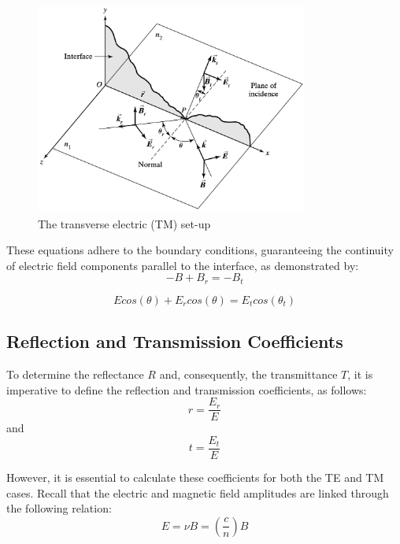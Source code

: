 \begin{figure}
  \centering
  \includegraphics[width=0.8\textwidth]{Chapters/Figures/Incident, Relfected, and Transmitted Ray for TM Mode.jpg}
  \caption{The transverse electric (TM) set-up}
\end{figure}

These equations adhere to the boundary conditions, guaranteeing the continuity of electric field components parallel to the interface, as demonstrated by:
\begin{equation} \label{Magnetic field boundary conditions for TM waves}
-B + B_r = -B_t
\end{equation}

\begin{equation} \label{Electric field boundary conditions for TM waves}
Ecos(\theta) + E_rcos(\theta) = E_tcos(\theta_t)
\end{equation}

\subsection{Reflection and Transmission Coefficients}
To determine the reflectance $R$ and, consequently, the transmittance $T$, it is imperative to define the reflection and transmission coefficients, as follows:
\begin{equation} \label{Definition of the reflection coefficient}
r = \frac{E_r}{E}
\end{equation}
and
\begin{equation} \label{Definition of the transmission coefficient}
t = \frac{E_t}{E}
\end{equation}

However, it is essential to calculate these coefficients for both the TE and TM cases. Recall that the electric and magnetic field amplitudes are linked through the following relation:
\begin{equation} \label{Equation relating the electric and magnetic field amplitudes}
E = \nu B = \left(\frac{c}{n}\right)B
\end{equation}

